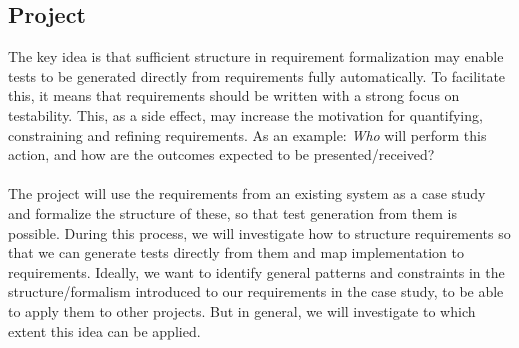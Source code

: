 \documentclass[10pt]{scrreprt}
\begin{document}
\subsection*{Project}
The key idea is that sufficient structure in requirement formalization may enable tests to be generated directly from requirements fully automatically. To facilitate this, it means that requirements should be written with a strong focus on testability. This, as a side effect, may increase the motivation for quantifying, constraining and refining requirements. As an example: \emph{Who} will perform this action, and how are the outcomes expected to be presented/received?\\\\
The project will use the requirements from an existing system as a case study and formalize the structure of these, so that test generation from them is possible. During this process, we will investigate how to structure requirements so that we can generate tests directly from them and map implementation to requirements. Ideally, we want to identify general patterns and constraints in the structure/formalism introduced to our requirements in the case study, to be able to apply them to other projects. But in general, we will investigate to which extent this idea can be applied.
\end{document}
